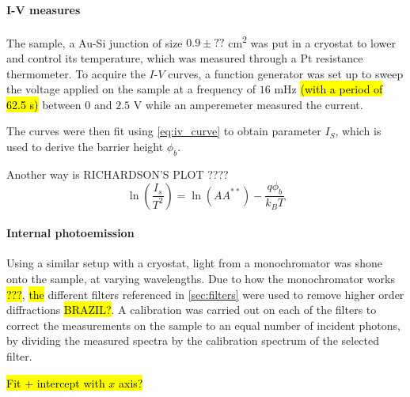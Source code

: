 \paragraph{I-V measures}
The sample, a Au-Si junction of size $0.9 \pm ??$ \unit{\cm\squared} was put in a cryostat to lower and control its temperature, which was measured through a Pt resistance thermometer.
To acquire the $I$-$V$ curves, a function generator was set up to sweep the voltage applied on the sample at a frequency of $16$ mHz \hl{(with a period of 62.5 s)} between $0$ and $2.5$ V while an amperemeter measured the current. 

The curves were then fit using \autoref{eq:iv_curve} to obtain parameter $I_S$, which is used to derive the barrier height $\phi_b$.

Another way is RICHARDSON'S PLOT ????
\begin{equation} \label{eq:richardson}
    \ln \left(\frac{I_s}{T^2}\right) = \ln(A A^{**}) - \frac{q \phi_b}{k_B T}
\end{equation}

\paragraph{Internal photoemission}
Using a similar setup with a cryostat, light from a monochromator was shone onto the sample, at varying wavelengths. Due to how the monochromator works \hl{???}, \hl{the} different filters referenced in \autoref{sec:filters} were used to remove higher order diffractions \hl{BRAZIL?}. A calibration was carried out on each of the filters to correct the measurements on the sample to an equal number of incident photons, by dividing the measured spectra by the calibration spectrum of the selected filter.

\hl{Fit + intercept with $x$ axis?}

